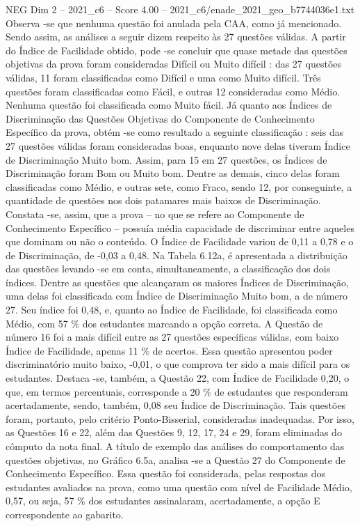 \begin{textsample}{NEG Dim 2 – 2021\_c6 – Score 4.00 – 2021\_c6/enade\_2021\_geo\_b7744036e1.txt}
Observa -se que nenhuma questão foi anulada pela CAA, como já mencionado.
Sendo assim, as análises a seguir dizem respeito às 27 questões válidas.
A partir do Índice de Facilidade obtido, pode -se concluir que quase metade das questões objetivas da prova foram consideradas Difícil ou Muito difícil : das 27 questões válidas, 11 foram classificadas como Difícil e uma como Muito difícil.
Três questões foram classificadas como Fácil, e outras 12 consideradas como Médio.
Nenhuma questão foi classificada como Muito fácil.
Já quanto aos Índices de Discriminação das Questões Objetivas do Componente de Conhecimento Específico da prova, obtém -se como resultado a seguinte classificação : seis das 27 questões válidas foram consideradas boas, enquanto nove delas tiveram Índice de Discriminação Muito bom.
Assim, para 15 em 27 questões, os Índices de Discriminação foram Bom ou Muito bom.
Dentre as demais, cinco delas foram classificadas como Médio, e outras sete, como Fraco, sendo 12, por conseguinte, a quantidade de questões nos dois patamares mais baixos de Discriminação.
Constata -se, assim, que a prova – no que se refere ao Componente de Conhecimento Específico – possuía média capacidade de discriminar entre aqueles que dominam ou não o conteúdo.
O Índice de Facilidade variou de 0,11 a 0,78 e o de Discriminação, de -0,03 a 0,48.
Na Tabela 6.12a, é apresentada a distribuição das questões levando -se em conta, simultaneamente, a classificação dos dois índices.
Dentre as questões que alcançaram os maiores Índices de Discriminação, uma delas foi classificada com Índice de Discriminação Muito bom, a de número 27.
Seu índice foi 0,48, e, quanto ao Índice de Facilidade, foi classificada como Médio, com 57 \% dos estudantes marcando a opção correta.
A Questão de número 16 foi a mais difícil entre as 27 questões específicas válidas, com baixo Índice de Facilidade, apenas 11 \% de acertos.
Essa questão apresentou poder discriminatório muito baixo, -0,01, o que comprova ter sido a mais difícil para os estudantes.
Destaca -se, também, a Questão 22, com Índice de Facilidade 0,20, o que, em termos percentuais, corresponde a 20 \% de estudantes que responderam acertadamente, sendo, também, 0,08 seu Índice de Discriminação.
Tais questões foram, portanto, pelo critério Ponto-Bisserial, consideradas inadequadas.
Por isso, as Questões 16 e 22, além das Questões 9, 12, 17, 24 e 29, foram eliminadas do cômputo da nota final.
A título de exemplo das análises do comportamento das questões objetivas, no Gráfico 6.5a, analisa -se a Questão 27 do Componente de Conhecimento Específico.
Essa questão foi considerada, pelas respostas dos estudantes avaliados na prova, como uma questão com nível de Facilidade Médio, 0,57, ou seja, 57 \% dos estudantes assinalaram, acertadamente, a opção E correspondente ao gabarito.

\end{textsample}
